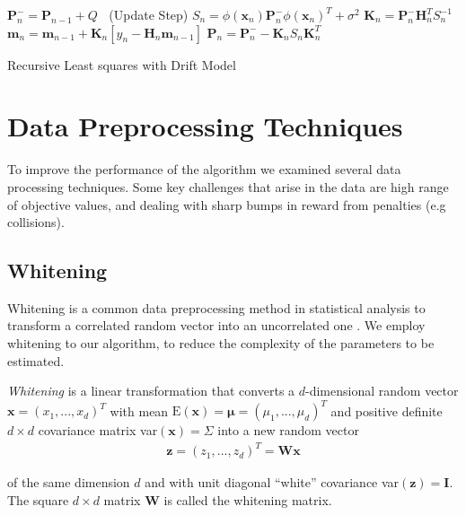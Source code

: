 \begin{algorithm}[H]
\DontPrintSemicolon
\SetAlgoLined


{
  $\mathbf{P}_n^- = \mathbf{P}_{n-1} + Q$ \;
  $~$ \;
  \Begin(Update Step)
  {
    $S_n = \phi(\mathbf{x}_n) \mathbf{P}_n^- \phi(\mathbf{x}_n)^T + \sigma^2$ \;
    $\textbf{K}_n = \textbf{P}_{n}^{-} \textbf{H}^T_n S_n^{-1}$ \;
    $\textbf{m}_n = \textbf{m}_{n-1} + \textbf{K}_n [y_n - \textbf{H}_n \textbf{m}_{n-1}]$ \;
    $\textbf{P}_n = \textbf{P}_{n}^{-} - \textbf{K}_n S_n \textbf{K}_n^T $ \;
  }
}
\caption{Recursive Least squares with Drift Model}
\label{RLS:basic}
\end{algorithm}


\section{Data Preprocessing Techniques}
To improve the performance of the algorithm we examined several
data processing techniques. Some key challenges
that arise in the data  are
high range of objective values,
and dealing with sharp bumps in reward from
penalties (e.g collisions).

\subsection{Whitening}
Whitening is a common data preprocessing method in statistical analysis
to transform a correlated random vector into an uncorrelated one
\citep{kessy2018optimal}.
We employ whitening to our algorithm, to reduce the complexity of the
parameters to be estimated. 

\textit{Whitening} is a linear transformation that converts a $d$-dimensional
random vector $\mathbf{x} = (x_1,...,x_d)^T$ with mean
$\text{E}(\mathbf{x}) = \mathbf{\mu} = (\mu_1,...,\mu_d)^T$ and
positive definite $d \times d$ covariance matrix
var$(\mathbf{x}) = \Sigma$ into a new random vector
\begin{align}
  \label{whitening}
 \mathbf{z} = (z_1,...,z_d)^T = \mathbf{W}\mathbf{x}
\end{align}

of the same dimension $d$ and with unit diagonal ``white'' covariance
var$(\mathbf{z}) = \mathbf{I}$. The square $d \times d$
matrix $\mathbf{W}$ is called the whitening matrix.

